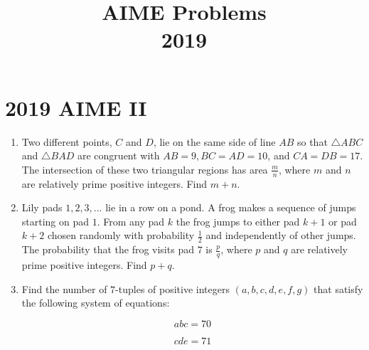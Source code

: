 \documentclass{article}
\title{AIME Problems \\ 2019}
\date{}
\begin{document}
\maketitle\thispagestyle{fancy}\newpage\section*{2019 AIME II}
\begin{enumerate}[label=\arabic*., itemsep=0.5em]
\item Two different points, \(C\) and \(D\), lie on the same side of line \(AB\) so that \(\triangle ABC\) and \(\triangle BAD\) are congruent with \(AB=9,BC=AD=10\), and \(CA=DB=17\). The intersection of these two triangular regions has area \(\tfrac{m}{n}\), where \(m\) and \(n\) are relatively prime positive integers. Find \(m+n\).\par \vspace{0.5em}\item Lily pads \(1,2,3,\ldots\) lie in a row on a pond. A frog makes a sequence of jumps starting on pad \(1\). From any pad \(k\) the frog jumps to either pad \(k+1\) or pad \(k+2\) chosen randomly with probability \(\tfrac{1}{2}\) and independently of other jumps. The probability that the frog visits pad \(7\) is \(\tfrac{p}{q}\), where \(p\) and \(q\) are relatively prime positive integers. Find \(p+q\).\par \vspace{0.5em}\item Find the number of \(7\)-tuples of positive integers \((a,b,c,d,e,f,g)\) that satisfy the following system of equations: 

\begin{equation*}
abc=70
\end{equation*}


\begin{equation*}
cde=71
\end{equation*}



\end{enumerate}
\end{document}
